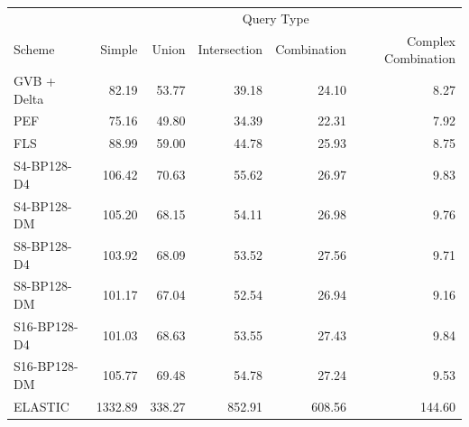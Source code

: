 \begin{tabular}{lrrrrr}
\toprule
 & \multicolumn{5}{c}{Query Type} \\
Scheme & Simple & Union & Intersection & Combination & Complex Combination \\
\midrule
GVB + Delta & 82.19 & 53.77 & 39.18 & 24.10 & 8.27 \\
PEF & 75.16 & 49.80 & 34.39 & 22.31 & 7.92 \\
FLS & 88.99 & 59.00 & 44.78 & 25.93 & 8.75 \\
S4-BP128-D4 & 106.42 & 70.63 & 55.62 & 26.97 & 9.83 \\
S4-BP128-DM & 105.20 & 68.15 & 54.11 & 26.98 & 9.76 \\
S8-BP128-D4 & 103.92 & 68.09 & 53.52 & 27.56 & 9.71 \\
S8-BP128-DM & 101.17 & 67.04 & 52.54 & 26.94 & 9.16 \\
S16-BP128-D4 & 101.03 & 68.63 & 53.55 & 27.43 & 9.84 \\
S16-BP128-DM & 105.77 & 69.48 & 54.78 & 27.24 & 9.53 \\
ELASTIC & 1332.89 & 338.27 & 852.91 & 608.56 & 144.60 \\
\bottomrule
\end{tabular}
